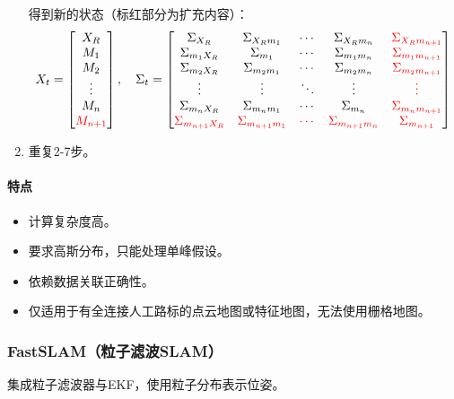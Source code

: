 \documentclass[
12pt, %
a4paper, 
oneside, %
headinclude,footinclude, %
]{scrartcl}
\begin{document}
\begin{enumerate}
得到新的状态（标红部分为扩充内容）：
\begin{align*}
X_t = \begin{bmatrix} X_R \\ M_1 \\ M_2 \\ \vdots \\ M_n \\ \color{red} M_{n + 1} \end{bmatrix}, \quad
\Sigma_t = \begin{bmatrix} 
\Sigma_{X_R} & \Sigma_{X_R m_1} & \cdots & \Sigma_{X_R m_n} & \color{red}\Sigma_{X_R m_{n + 1}} \\
\Sigma_{m_1 X_R} & \Sigma_{m_1} & \cdots & \Sigma_{m_1 m_n} & \color{red}\Sigma_{m_1 m_{n + 1}} \\
\Sigma_{m_2 X_R} & \Sigma_{m_2 m_1} & \cdots & \Sigma_{m_2 m_n} & \color{red}\Sigma_{m_2 m_{n + 1}} \\
\vdots & \vdots & \ddots & \vdots & \color{red}\vdots \\
\Sigma_{m_n X_R} & \Sigma_{m_n m_1} & \cdots & \Sigma_{m_n} & \color{red}\Sigma_{m_n m_{n + 1}} \\
\color{red}\Sigma_{m_{n + 1} X_R} & \color{red}\Sigma_{m_{n + 1} m_1} & \color{red}\cdots & \color{red}\Sigma_{m_{n + 1} m_n} & \color{red}\Sigma_{m_{n + 1}}
\end{bmatrix}
\end{align*}
\item 重复2-7步。
\end{enumerate}
\paragraph{特点}
\begin{itemize}
\item 计算复杂度高。
\item 要求高斯分布，只能处理单峰假设。
\item 依赖数据关联正确性。
\item 仅适用于有全连接人工路标的点云地图或特征地图，无法使用栅格地图。
\end{itemize}
\subsubsection[FastSLAM]{FastSLAM（粒子滤波SLAM）}
集成粒子滤波器与EKF，使用粒子分布表示位姿。
\end{document}
